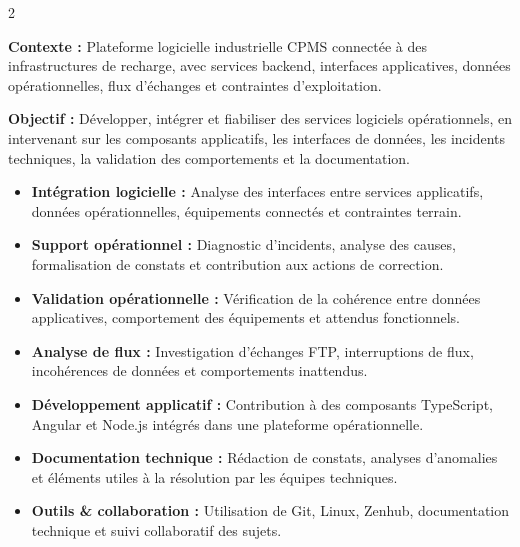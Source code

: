 \documentclass[8pt,a4paper,ragged2e,withhyper]{altacv}
\begin{document}



\makecvheader
\vspace{-0.3cm}


\begin{paracol}{2}



\textbf{Contexte :} Plateforme logicielle industrielle CPMS connectée à des infrastructures de recharge, avec services backend, interfaces applicatives, données opérationnelles, flux d’échanges et contraintes d’exploitation.

\textbf{Objectif :} Développer, intégrer et fiabiliser des services logiciels opérationnels, en intervenant sur les composants applicatifs, les interfaces de données, les incidents techniques, la validation des comportements et la documentation.

\begin{itemize}
  \item \textbf{Intégration logicielle :} Analyse des interfaces entre services applicatifs, données opérationnelles, équipements connectés et contraintes terrain.
  \item \textbf{Support opérationnel :} Diagnostic d’incidents, analyse des causes, formalisation de constats et contribution aux actions de correction.
  \item \textbf{Validation opérationnelle :} Vérification de la cohérence entre données applicatives, comportement des équipements et attendus fonctionnels.
  \item \textbf{Analyse de flux :} Investigation d’échanges FTP, interruptions de flux, incohérences de données et comportements inattendus.
  \item \textbf{Développement applicatif :} Contribution à des composants TypeScript, Angular et Node.js intégrés dans une plateforme opérationnelle.
  \item \textbf{Documentation technique :} Rédaction de constats, analyses d’anomalies et éléments utiles à la résolution par les équipes techniques.
  \item \textbf{Outils \& collaboration :} Utilisation de Git, Linux, Zenhub, documentation technique et suivi collaboratif des sujets.
\end{itemize}


\end{paracol}
\end{document}
